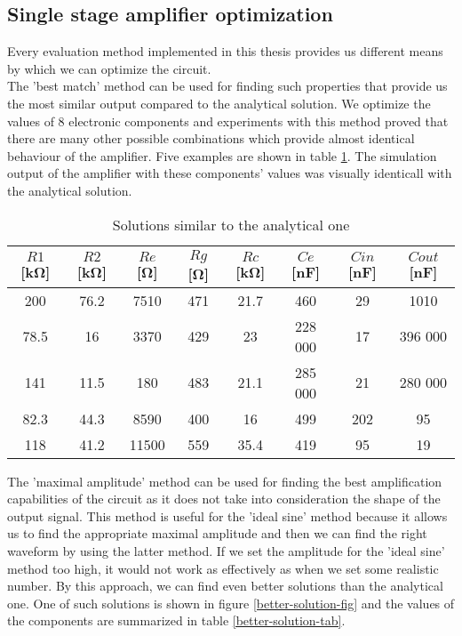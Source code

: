 \subsection{Single stage amplifier optimization} \label{single-stage-results}
Every evaluation method implemented in this thesis provides us different means by which we can optimize the circuit.\\
The 'best match' method can be used for finding such properties that provide us the most similar output compared to the analytical solution. We optimize the values of 8 electronic components and experiments with this method proved that there are many other possible combinations which provide almost identical behaviour of the amplifier. Five examples are shown in table \ref{best-fit-solutions}. The simulation output of the amplifier with these components' values was visually identicall with the analytical solution.\\

\begin{table}[H]
\centering
\begin{tabular}{@{}c ccccccc@{}}
\toprule
    $R1$ [\si{\kilo\ohm}] & $R2$ [\si{\kilo\ohm}] & $Re$ [\si{\ohm}] & $Rg$ [\si{\ohm}] & $Rc$ [\si{\kilo\ohm}] & $Ce$ [\si{\nano\farad}] & $Cin$ [\si{\nano\farad}] & $Cout$ [\si{\nano\farad}] \\
    \midrule
    200   & 76.2 & 7510  & 471 & 21.7 & 460     & 29    & 1010 \\
    78.5  & 16   & 3370  & 429 & 23   & 228 000 & 17    & 396 000 \\
    141   & 11.5 & 180   & 483 & 21.1 & 285 000 & 21    & 280 000 \\
    82.3  & 44.3 & 8590  & 400 & 16   & 499     & 202   & 95 \\
    118   & 41.2 & 11500 & 559 & 35.4 & 419     & 95    & 19 \\
    \bottomrule
\end{tabular}
\caption{Solutions similar to the analytical one}
\label{best-fit-solutions}
\end{table}

The 'maximal amplitude' method can be used for finding the best amplification capabilities of the circuit as it does not take into consideration the shape of the output signal. This method is useful for the 'ideal sine' method because it allows us to find the appropriate maximal amplitude and then we can find the right waveform by using the latter method. If we set the amplitude for the 'ideal sine' method too high, it would not work as effectively as when we set some realistic number. By this approach, we can find even better solutions than the analytical one. One of such solutions is shown in figure \ref{better-solution-fig} and the values of the components are summarized in table \ref{better-solution-tab}.\\

